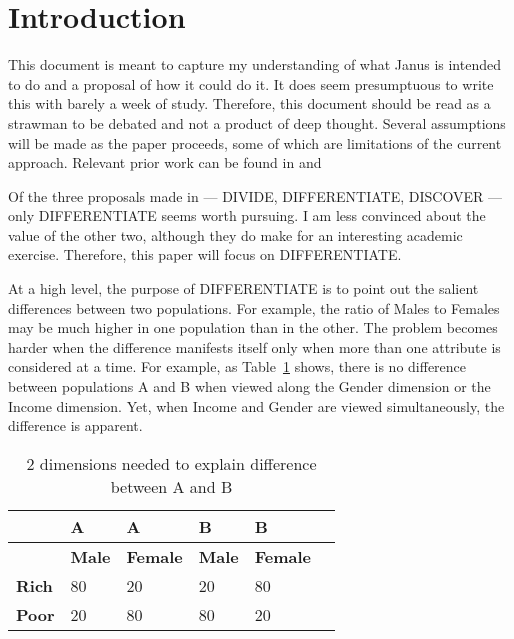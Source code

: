 
\section{Introduction}

This document is meant to capture my understanding of what Janus is
intended to do and a proposal of how it could do it. It does seem
presumptuous to write this with barely a week of study. Therefore,
this document should be read as a strawman to be debated and not a
product of deep thought. Several assumptions will be made as the paper proceeds,
some of which are limitations of the current approach.
Relevant prior work can be found in \cite{sarawagi99}
and \cite{Fagin05}

Of the three proposals made in \cite{Fagin05} --- DIVIDE,
DIFFERENTIATE, DISCOVER --- only DIFFERENTIATE seems worth pursuing. 
I am less convinced about the value of the other two, although they do 
make for an interesting academic exercise. 
Therefore, this paper will focus on DIFFERENTIATE.

At a high level, the purpose of DIFFERENTIATE is to point out the salient
differences between two populations. For example, the ratio of Males to Females
may be much higher in one population than in the other. The problem becomes
harder when the difference manifests itself only when more than one attribute is
considered at a time. For example, as Table~\ref{tbl_sample_multi_dim_diff}
shows, there is no difference between populations A and B when viewed along
the Gender dimension or the Income dimension. Yet, when Income and Gender are
viewed simultaneously, the difference is apparent.

\begin{table}[hbtp]
\centering
\begin{tabular}{|l|l|l||l|l|l|} \hline \hline
           &  {\bf A}   &  {\bf A}     &  {\bf B}   &  {\bf B}    \\ \hline
           & {\bf Male} & {\bf Female} &{\bf Male} & {\bf Female} \\ \hline
{\bf Rich} &    80      &     20       &    20      &     80      \\ \hline
{\bf Poor} &    20      &     80       &    80      &     20      \\ \hline
\hline
\end{tabular}
\caption{2 dimensions needed to explain difference between A and B}
\label{tbl_sample_multi_dim_diff}
\end{table}




